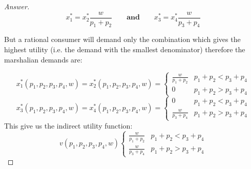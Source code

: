 \documentclass{article}
\theoremstyle{definition}
\newcommand{\qaq}{\qquad \textbf{and} \qquad}
\begin{document}
\begin{proof}[Answer]
$$x_1^* = x_2^* \frac{w}{p_1+p_2} \qaq x_3^* = x_4^* \frac{w}{p_3+p_4} $$

But a rational consumer will demand only the combination which gives the highest utility (i.e. the demand with the smallest denominator) therefore the marshalian demands are:

$$x_1^*(p_1,p_2,p_3,p_4,w) = x_2^*(p_1,p_2,p_3,p_4,w) = \left \{ \begin{array}{cc}
     \frac{w}{p_1+p_2}&  p_1 + p_2 < p_3 + p_4 \\
     0&  p_1 + p_2 > p_3 + p_4\end{array}$$ 
 $$x_3^*(p_1,p_2,p_3,p_4,w) = x_4^*(p_1,p_2,p_3,p_4,w) = \left \{ \begin{array}{cc}
     0&  p_1 + p_2 < p_3 + p_4 \\
     \frac{w}{p_3+p_4}&  p_1 + p_2 > p_3 + p_4\end{array}$$
This give us the indirect utility function:
$$v(p_1,p_2,p_3,p_4,w) \left \{ \begin{array}{cc}
     \frac{w}{p_1+p_2}&  p_1 + p_2 < p_3 + p_4 \\
       \frac{w}{p_3+p_4}&  p_1 + p_2 > p_3 + p_4\end{array}$$ 
\end{proof}
\end{document}
